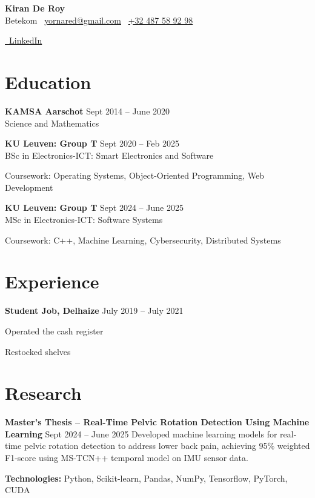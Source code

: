 \documentclass[10pt,a4paper]{article}
\newcommand{\header}[4]{
    \begin{center}
        {\LARGE \textbf{#1}}\\[2pt]
        #2 \textbullet\ 
        \href{mailto:#3}{#3} \textbullet\ 
        \href{tel:#4}{#4} \\
    \end{center}
    \vspace{0.2cm}
}
\begin{document}
\header{Kiran De Roy}{Betekom}{yornared@gmail.com}{+32 487 58 92 98}{\href{https://linkedin.com/in/kiran-de-roy-57a440269}{\faLinkedin\ LinkedIn}}

\section{Education}
\textbf{KAMSA Aarschot} \hfill Sept 2014 -- June 2020\\
Science and Mathematics


\textbf{KU Leuven: Group T} \hfill Sept 2020 -- Feb 2025\\
BSc in Electronics-ICT: Smart Electronics and Software  
\begin{highlights}
    \item Coursework: Operating Systems, Object-Oriented Programming, Web Development
\end{highlights}


\textbf{KU Leuven: Group T} \hfill Sept 2024 -- June 2025\\
MSc in Electronics-ICT: Software Systems  
\begin{highlights}
    \item Coursework: C++, Machine Learning, Cybersecurity, Distributed Systems
\end{highlights}

\section{Experience}
\textbf{Student Job, Delhaize} \hfill July 2019 -- July 2021  
\begin{highlights}
    \item Operated the cash register
    \item Restocked shelves
\end{highlights}

\section{Research}
\textbf{Master's Thesis – Real-Time Pelvic Rotation Detection Using Machine Learning} \hfill Sept 2024 -- June 2025  
Developed machine learning models for real-time pelvic rotation detection to address lower back pain, achieving 95\% weighted F1-score using MS-TCN++ temporal model on IMU sensor data.  

\textbf{Technologies:} Python, Scikit-learn, Pandas, NumPy, Tensorflow, PyTorch, CUDA  
\end{document}
